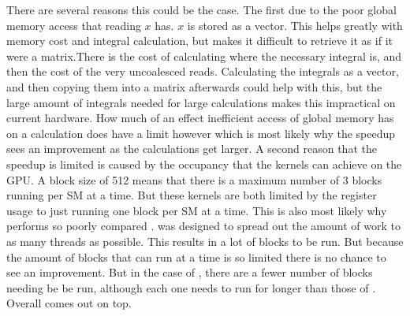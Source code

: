 There are several reasons this could be the case. The first due to the poor global memory access that reading $x$ has. $x$ is stored as a vector. This helps greatly with memory cost and integral calculation, but makes it difficult to retrieve it as if it were a matrix.There is the cost of calculating where the necessary integral is, and then the cost of the very uncoalesced reads. Calculating the integrals as a vector, and then copying them into a matrix afterwards could help with this, but the large amount of integrals needed for large calculations makes this impractical on current hardware. How much of an effect inefficient access of global memory has on a calculation does have a limit however which is most likely why the speedup sees an improvement as the calculations get larger. A second reason that the speedup is limited is caused by the occupancy that the kernels can achieve on the GPU. A block size of 512 means that there is a maximum number of 3 blocks running per SM at a time. But these kernels are both limited by the register usage to just running one block per SM at a time. This is also most likely why  performs so poorly compared .  was designed to spread out the amount of work to as many threads as possible. This results in a lot of blocks to be run. But because the amount of blocks that can run at a time is so limited there is no chance to see an improvement. But in the case of , there are a fewer number of blocks needing be be run, although each one needs to run for longer than those of . Overall  comes out on top.

